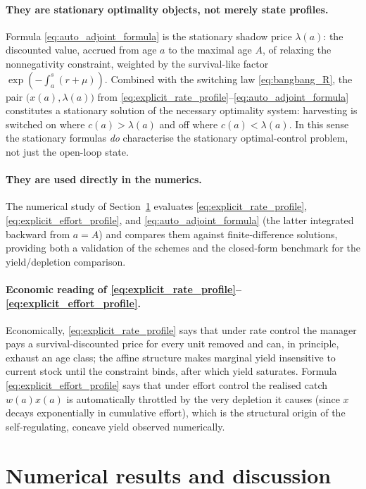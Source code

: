 \documentclass[pdflatex,sn-mathphys-num]{sn-jnl}
\theoremstyle{definition}
\theoremstyle{remark}
\begin{document}
\paragraph{They are stationary optimality objects, not merely state profiles.}
Formula \eqref{eq:auto_adjoint_formula} is the stationary shadow price
$\lambda(a)$: the discounted value, accrued from age $a$ to the maximal age
$A$, of relaxing the nonnegativity constraint, weighted by the survival-like
factor $\exp(-\int_a^s(r+\mu))$. Combined with the switching law
\eqref{eq:bangbang_R}, the pair
$\bigl(x(a),\lambda(a)\bigr)$ from
\eqref{eq:explicit_rate_profile}--\eqref{eq:auto_adjoint_formula} constitutes
a stationary solution of the necessary optimality system: harvesting is
switched on where $c(a)>\lambda(a)$ and off where $c(a)<\lambda(a)$. In this
sense the stationary formulas \emph{do} characterise the stationary
optimal-control problem, not just the open-loop state.

\paragraph{They are used directly in the numerics.}
The numerical study of Section~\ref{sec:numerics} evaluates
\eqref{eq:explicit_rate_profile}, \eqref{eq:explicit_effort_profile}, and
\eqref{eq:auto_adjoint_formula} (the latter integrated backward from $a=A$)
and compares them against finite-difference solutions, providing both a
validation of the schemes and the closed-form benchmark for the
yield/depletion comparison.

\paragraph{Economic reading of
\eqref{eq:explicit_rate_profile}--\eqref{eq:explicit_effort_profile}.}
Economically, \eqref{eq:explicit_rate_profile} says that under rate control
the manager pays a survival-discounted price for every unit removed and can,
in principle, exhaust an age class; the affine structure makes marginal yield
insensitive to current stock until the constraint binds, after which yield
saturates. Formula \eqref{eq:explicit_effort_profile} says that under effort
control the realised catch $w(a)x(a)$ is automatically throttled by the very
depletion it causes (since $x$ decays exponentially in cumulative effort),
which is the structural origin of the self-regulating, concave yield observed
numerically.

\section{Numerical results and discussion}
\label{sec:numerics}
\end{document}
